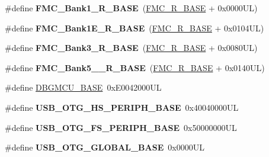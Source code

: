 \begin{DoxyCompactItemize}
\#define {\bfseries F\+M\+C\+\_\+\+Bank1\+\_\+\+R\+\_\+\+B\+A\+SE}~(\mbox{\hyperlink{group___peripheral__memory__map_ga7a599164cd92798542bc6288793d1ed5}{F\+M\+C\+\_\+\+R\+\_\+\+B\+A\+SE}} + 0x0000\+U\+L)
\item 
\mbox{\label{group___peripheral__memory__map_gad82d3a6bac014fa645fb67a63fae4bc0}} 
\#define {\bfseries F\+M\+C\+\_\+\+Bank1\+E\+\_\+\+R\+\_\+\+B\+A\+SE}~(\mbox{\hyperlink{group___peripheral__memory__map_ga7a599164cd92798542bc6288793d1ed5}{F\+M\+C\+\_\+\+R\+\_\+\+B\+A\+SE}} + 0x0104\+U\+L)
\item 
\mbox{\label{group___peripheral__memory__map_gaf570671195a13f4bb2a1b8f2bd5305c9}} 
\#define {\bfseries F\+M\+C\+\_\+\+Bank3\+\_\+\+R\+\_\+\+B\+A\+SE}~(\mbox{\hyperlink{group___peripheral__memory__map_ga7a599164cd92798542bc6288793d1ed5}{F\+M\+C\+\_\+\+R\+\_\+\+B\+A\+SE}} + 0x0080\+U\+L)
\item 
\mbox{\label{group___peripheral__memory__map_gace117149a4fc0d07c38cc997fe4c4a73}} 
\#define {\bfseries F\+M\+C\+\_\+\+Bank5\+\_\+\_\+\+R\+\_\+\+B\+A\+SE}~(\mbox{\hyperlink{group___peripheral__memory__map_ga7a599164cd92798542bc6288793d1ed5}{F\+M\+C\+\_\+\+R\+\_\+\+B\+A\+SE}} + 0x0140\+U\+L)
\item 
\#define \mbox{\hyperlink{group___peripheral__memory__map_ga4adaf4fd82ccc3a538f1f27a70cdbbef}{D\+B\+G\+M\+C\+U\+\_\+\+B\+A\+SE}}~0x\+E0042000\+UL
\item 
\mbox{\label{group___peripheral__memory__map_gaa405d2ebfd7e9394237b6639f16a5409}} 
\#define {\bfseries U\+S\+B\+\_\+\+O\+T\+G\+\_\+\+H\+S\+\_\+\+P\+E\+R\+I\+P\+H\+\_\+\+B\+A\+SE}~0x40040000\+UL
\item 
\mbox{\label{group___peripheral__memory__map_gaa86d4c80849a74938924e73937b904e7}} 
\#define {\bfseries U\+S\+B\+\_\+\+O\+T\+G\+\_\+\+F\+S\+\_\+\+P\+E\+R\+I\+P\+H\+\_\+\+B\+A\+SE}~0x50000000\+UL
\item 
\mbox{\label{group___peripheral__memory__map_ga044aa4388e72d9d47a03f387fb8926fb}} 
\#define {\bfseries U\+S\+B\+\_\+\+O\+T\+G\+\_\+\+G\+L\+O\+B\+A\+L\+\_\+\+B\+A\+SE}~0x0000\+UL
\item 

\end{DoxyCompactItemize}
